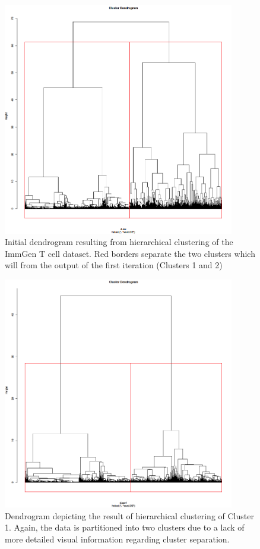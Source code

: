 \begin{figure}[H] 
    \centering
\includegraphics[width=0.9\textwidth]{Figures/Chapter4/hclust/immgen_tcell_only_hclust.png}
\caption{\small{Initial dendrogram resulting from hierarchical clustering of the ImmGen T cell dataset. Red borders separate the two clusters which will from the output of the first iteration (Clusters 1 and 2) } }
   \label{fig:16}
\end{figure}


\begin{figure}[H] 
    \centering
\includegraphics[width=0.9\textwidth]{Figures/Chapter4/hclust/immgen_tcell_only_hclust_CLUSTER1.png}
\caption{\small{Dendrogram depicting the result of hierarchical clustering of Cluster 1. Again, the data is partitioned into two clusters due to a lack of more detailed visual information regarding cluster separation. } }
\label{fig:17}
\end{figure}



